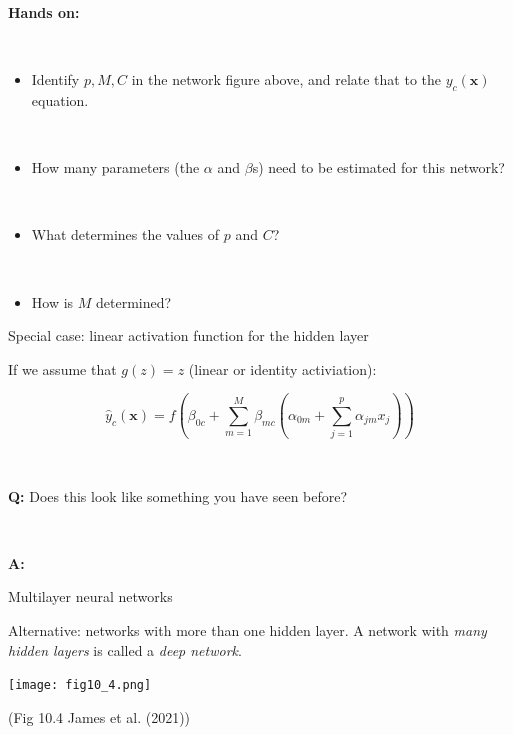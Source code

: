 \documentclass[
  10pt,
  ignorenonframetext,
]{beamer}
\providecommand{\tightlist}{%
  \setlength{\itemsep}{0pt}\setlength{\parskip}{0pt}}
\begin{document}
\begin{frame}
\textbf{Hands on:}

\(~\)

\begin{itemize}
\tightlist
\item
  Identify \(p, M, C\) in the network figure above, and relate that to
  the \(y_{c}({\boldsymbol x})\) equation.
\end{itemize}

\(~\)

\begin{itemize}
\tightlist
\item
  How many parameters (the \(\alpha\) and \(\beta\)s) need to be
  estimated for this network?
\end{itemize}

\(~\)

\begin{itemize}
\tightlist
\item
  What determines the values of \(p\) and \(C\)?
\end{itemize}

\(~\)

\begin{itemize}
\tightlist
\item
  How is \(M\) determined?
\end{itemize}
\end{frame}

\begin{frame}
\begin{block}{Special case: linear activation function for the hidden
layer}
\protect\hypertarget{special-case-linear-activation-function-for-the-hidden-layer}{}
\(~\)

If we assume that \(g(z)=z\) (linear or identity activiation):

\[
\hat{y}_c({\boldsymbol x})= f(\beta_{0c}+\sum_{m=1}^M \beta_{mc}(\alpha_{0m}+\sum_{j=1}^p \alpha_{jm}x_{j}))
\]

\(~\) \(~\)

\textbf{Q:} Does this look like something you have seen before?

\(~\)

\textbf{A:}
\end{block}
\end{frame}

\begin{frame}
\begin{block}{Multilayer neural networks}
\protect\hypertarget{multilayer-neural-networks}{}
\(~\)

Alternative: networks with more than one hidden layer. A network with
\emph{many hidden layers} is called a \emph{deep network}.

\centering

\texttt{[image: fig10\_4.png]}

\scriptsize

(Fig 10.4 James et al. (2021))
\end{block}
\end{frame}
\end{document}
